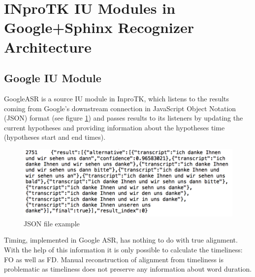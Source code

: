 \section {INproTK IU Modules in Google+Sphinx Recognizer Architecture}
\subsection  {Google IU Module}
GoogleASR is a source IU module in InproTK, which listens to the
results coming from Google's  downstream connection in JavaScript Object
Notation (JSON) format (see figure \ref{fig:json_ouput}) and passes results to
its listeners by updating the current hypotheses and providing information about the hypotheses time (hypotheses start and end times).

\begin{figure}[htbp]
  \centering
   \includegraphics[width=1\textwidth]{images/json_extr.png}
    \caption{JSON file example}
      \label{fig:json_ouput}
\end{figure}

 Timing, implemented in Google ASR, has nothing to do with true alignment.
With the help of this information  it is only possible to calculate the
timeliness: FO as well as FD.  Manual reconstruction of alignment from
timeliness is problematic as timeliness does not preserve any information about word
duration. 

